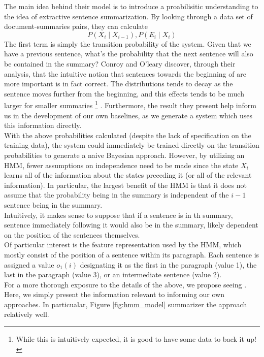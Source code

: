 \documentclass[10pt]{article}
\begin{document}
The main idea behind their model is to introduce a proabilisitic understanding to the idea of extractive sentence summarization. By looking through a data set of document-summaries pairs, they can calculate
$$
P(X_i \mid X_{i-1}), P(E_i \mid X_i)
$$
The first term is simply the transition probability of the system. Given that we have a previous sentence, what's the probability that the next sentence will also be contained in the summary? Conroy and O'leary discover, through their analysis, that the intuitive notion that sentences towards the beginning of are more important is in fact correct. The distributions tends to decay as the sentence moves further from the beginning, and this effects tends to be much larger for smaller summaries \footnote{While this is intuitively expected, it is good to have some data to back it up!} \cite{hmm_summary}. Furthermore, the result they present help inform us in the development of our own baselines, as we generate a system which uses this information directly. \\

With the above probabilities calculated (despite the lack of specification on the training data), the system could immediately be trained directly on the transition probabilities to generate a naive Bayesian approach. However, by utilizing an HMM, fewer assumptions on independence need to be made since the state $X_i$ learns all of the information about the states preceding it (or all of the relevant information). In particular, the largest benefit of the HMM is that it does not assume that the probability being in the summary is independent of the $i-1$ sentence being in the summary. \\

Intuitively, it makes sense to suppose that if a sentence is in th summary, sentence immediately following it would also be in the summary, likely dependent on the position of the sentences themselves. \\

Of particular interest is the feature representation used by the HMM, which mostly consist of the position of a sentence within its paragraph. Each sentence is assigned  a value $o_1(i)$ designating it as the first in the paragraph (value 1), the last in the paragraph (value $3$), or an intermediate sentence (value 2). \\

For a more thorough exposure to the details of the above, we propose seeing \cite{hmm_summary}. Here, we simply present the information relevant to informing our own approaches. In particualar, Figure \ref{fig:hmm_model} summarizer the approach relatively well.
\end{document}
